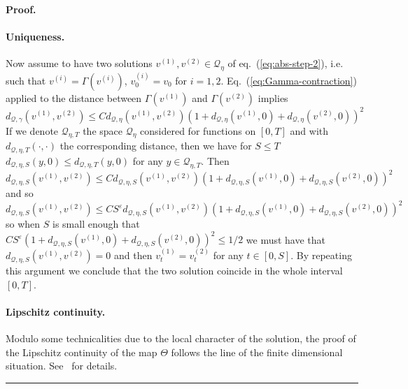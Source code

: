 \documentclass[a4paper,11pt,reqno]{article}
\newcommand{\eps}{\varepsilon}
\newcommand{\QQ}{\mathcal{Q}}
\newenvironment{proof}[1][Proof]{\textbf{#1.} }{\ \rule{0.5em}{0.5em}}
\begin{document}
\begin{proof}
\paragraph{Uniqueness.} Now assume to have two solutions 
$v^{(1)},v^{(2)} \in \QQ_\eta$ of eq.~(\ref{eq:abs-step-2}), i.e. such
that $v^{(i)} = \Gamma(v^{(i)})$, $v^{(i)}_0 = v_0$ for
$i=1,2$. Eq.~(\ref{eq:Gamma-contraction}) applied to the distance between $\Gamma(v^{(1)})
$ and $\Gamma(v^{(2)})$ implies
\begin{equation*}
 d_{\QQ,\gamma}(v^{(1)},v^{(2)}) \le C  d_{\QQ,\eta}(v^{(1)},v^{(2)}) (1+ d_{\QQ,\eta}(v^{(1)},0)+ d_{\QQ,\eta}(v^{(2)},0))^2   
\end{equation*}
If we denote $\QQ_{\eta,T}$ the space $\QQ_{\eta}$ considered for
functions on $[0,T]$ and with $ d_{\QQ,\eta,T}(\cdot,\cdot)$ the
corresponding distance, then we have for $S \le T$
$
 d_{\QQ,\eta,S}(y,0) \le   d_{\QQ,\eta,T}(y,0)
$ for any $y \in \QQ_{\eta,T}$. Then
\begin{equation*}
 d_{\QQ,\eta,S}(v^{(1)},v^{(2)}) \le C  d_{\QQ,\eta,S}(v^{(1)},v^{(2)}) (1+ d_{\QQ,\eta,S}(v^{(1)},0)+ d_{\QQ,\eta,S}(v^{(2)},0))^2   
\end{equation*}
and so
\begin{equation*}
 d_{\QQ,\eta,S}(v^{(1)},v^{(2)}) \le C S^\eps  d_{\QQ,\eta,S}(v^{(1)},v^{(2)}) (1+ d_{\QQ,\eta,S}(v^{(1)},0)+ d_{\QQ,\eta,S}(v^{(2)},0))^2   
\end{equation*}
so when $S$ is small enough that $C S^\eps
(1+ d_{\QQ,\eta,S}(v^{(1)},0)+ d_{\QQ,\eta,S}(v^{(2)},0))^2  \le 1/2  $ we
must have that $ d_{\QQ,\eta,S}(v^{(1)},v^{(2)}) = 0$ and then
$v^{(1)}_t = v^{(2)}_t$ for any $t \in [0,S]$. By repeating this
argument  we conclude that the two solution coincide in the whole interval
$[0,T]$.

\paragraph{Lipschitz continuity.}
Modulo some technicalities due to the local character of the solution, the proof of the Lipschitz continuity of the map $\Theta$ follows the line of the finite dimensional situation. See~\cite{MR2091358} for details.
\end{proof}


%
%
\end{document}
